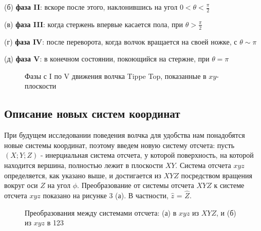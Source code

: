 \documentclass[a4paper,11.5pt]{article} %
\begin{document}
(б) \textbf{фаза II}: вскоре после этого, наклонившись на угол $0 <\theta < \frac{\pi}{2}$

(в) \textbf{фаза III}: когда стержень впервые касается пола, при $\theta > \frac{\pi}{2}$

(г) \textbf{фаза IV}: после переворота, когда волчок вращается на своей ножке, с $\theta \sim \pi$ 

(д) \textbf{фаза V}: в конечном состоянии, покоющийся на стержне, при $\theta = \pi$

\begin{figure}[!ht]
	\caption{ Фазы с I по V движения волчка Tippe Top, показанные в $xy$-				плоскости}
	\label{figimage2}
\end{figure}
\vspace{1em}


\subsection{Описание новых систем координат}

При будущем исследовании поведения волчка для удобства нам понадобятся новые системы координат, поэтому введем новую систему отсчета: пусть $(X;Y;Z)$ - инерциальная система отсчета, у которой поверхность, на которой находится вершина, полностью лежит в плоскости $XY$. Система  отсчета $xyz$ определяется, как указано выше, и достигается из $XYZ$ посредством вращения вокруг оси $Z$ на угол $\phi$. Преобразование от системы отсчета $XYZ$ к системе отсчета $xyz$ показано на рисунке 3 (а). В частности, $\hat{z}$ = $\hat{Z}$.

\begin{figure}[h]
	\caption{ Преобразования между системами отсчета: (а) в $xyz$ из $XYZ$, и (б) из $xyz$ в 123}
	\label{figimage3}
\end{figure}
\end{document}
